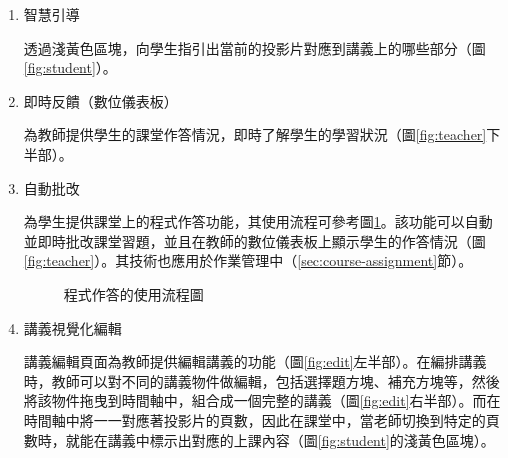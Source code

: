 \begin{enumerate}
  \setlength{\parindent}{2em}

  \item 智慧引導
  \par 透過淺黃色區塊，向學生指引出當前的投影片對應到講義上的哪些部分（圖\ref{fig:student}）。
  
  \item 即時反饋（數位儀表板）
  \par 為教師提供學生的課堂作答情況，即時了解學生的學習狀況（圖\ref{fig:teacher}下半部）。

  \item 自動批改
  \par 為學生提供課堂上的程式作答功能，其使用流程可參考圖\ref{fig:problem-flowchart}。該功能可以自動並即時批改課堂習題，並且在教師的數位儀表板上顯示學生的作答情況（圖\ref{fig:teacher}）。其技術也應用於作業管理中（\ref{sec:course-assignment}節）。
  
  \begin{figure}[H]
    \centering
    \caption{程式作答的使用流程圖}
    \label{fig:problem-flowchart}
  \end{figure}

  \item 講義視覺化編輯
  \par 講義編輯頁面為教師提供編輯講義的功能（圖\ref{fig:edit}左半部）。在編排講義時，教師可以對不同的講義物件做編輯，包括選擇題方塊、補充方塊等，然後將該物件拖曳到時間軸中，組合成一個完整的講義（圖\ref{fig:edit}右半部）。而在時間軸中將一一對應著投影片的頁數，因此在課堂中，當老師切換到特定的頁數時，就能在講義中標示出對應的上課內容（圖\ref{fig:student}的淺黃色區塊）。


\end{enumerate}
